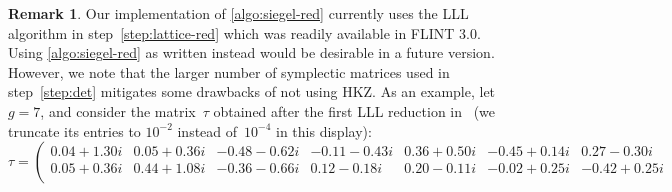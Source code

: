 \documentclass[12pt,oneside]{amsart}
\numberwithin{equation}{section}
\theoremstyle{definition}
\newtheorem{rem}[equation]{Remark}
\begin{document}
\begin{rem}
  Our implementation of \cref{algo:siegel-red} currently uses the LLL algorithm
  in step~\eqref{step:lattice-red} which was readily available in FLINT
  3.0. Using \cref{algo:siegel-red} as written instead would be desirable in a
  future version. However, we note that the larger number of symplectic
  matrices used in step~\eqref{step:det} mitigates some drawbacks of not using
  HKZ. As an example, let~$g = 7$, and consider the matrix~$\tau$ obtained
  after the first LLL reduction
  in~\cite[§4.2]{frauendienerEfficientComputationMultidimensional2019} (we
  truncate its entries to $10^{-2}$ instead of~$10^{-4}$ in this display):
  \begin{displaymath}
    \tau =
    \left(\begin{smallmatrix}
      0.04 + 1.30i & 0.05 + 0.36i & -0.48 - 0.62i &-0.11 - 0.43i &0.36 + 0.50i&  -0.45 + 0.14i&  0.27 - 0.30i\\
      0.05 + 0.36i & 0.44 + 1.08i & -0.36 - 0.66i &0.12 - 0.18i & 0.20 - 0.11i&  -0.02 + 0.25i& -0.42 + 0.25i\\

\end{smallmatrix}
\end{displaymath}
\end{rem}
\end{document}
